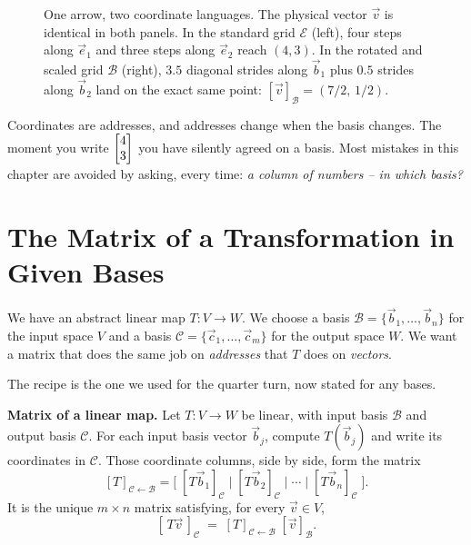 \begin{figure}[H]
\caption{One arrow, two coordinate languages. The physical vector $\vec{v}$ is identical in both panels. In the standard grid $\mathcal{E}$ (left), four steps along $\vec{e}_1$ and three steps along $\vec{e}_2$ reach $(4,3)$. In the rotated and scaled grid $\mathcal{B}$ (right), $3.5$ diagonal strides along $\vec{b}_1$ plus $0.5$ strides along $\vec{b}_2$ land on the exact same point: $[\vec{v}]_{\mathcal{B}} = (7/2,\,1/2)$.}
\label{ch31:fig-two-addresses}
\end{figure}

\begin{focusbox}
Coordinates are addresses, and addresses change when the basis changes. The
moment you write $\begin{bmatrix}4\\3\end{bmatrix}$ you have silently agreed on a basis. Most
mistakes in this chapter are avoided by asking, every time: \emph{a
column of numbers -- in which basis?}
\end{focusbox}

\section{The Matrix of a Transformation in Given Bases}
\label{ch31:matrix-of-T}

We have an abstract linear map
$T:V\to W$. We choose a basis $\mathcal{B}=\{\vec{b}_1,\dots,\vec{b}_n\}$ for the
input space $V$ and a basis $\mathcal{C}=\{\vec{c}_1,\dots,\vec{c}_m\}$ for the
output space $W$. We want a matrix that does the same job on \emph{addresses} that
$T$ does on \emph{vectors}.

The recipe is the one we used for the quarter turn, now stated for any bases.

\begin{formalbox}
\textbf{Matrix of a linear map.} Let $T:V\to W$ be linear, with input basis
$\mathcal{B}$ and output basis $\mathcal{C}$. For each input basis vector
$\vec{b}_j$, compute $T(\vec{b}_j)$ and write its coordinates in $\mathcal{C}$.
Those coordinate columns, side by side, form the matrix
\[
  [T]_{\mathcal{C}\leftarrow\mathcal{B}}
  = \Big[\; [T\vec{b}_1]_{\mathcal{C}} \;\big|\; [T\vec{b}_2]_{\mathcal{C}}
     \;\big|\; \cdots \;\big|\; [T\vec{b}_n]_{\mathcal{C}} \;\Big].
\]
It is the unique $m\times n$ matrix satisfying, for every $\vec{v}\in V$,
\[
  [\,T\vec{v}\,]_{\mathcal{C}} \;=\; [T]_{\mathcal{C}\leftarrow\mathcal{B}}\;[\vec{v}]_{\mathcal{B}}.
\]
\end{formalbox}

